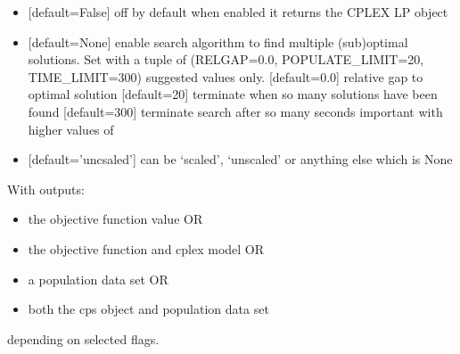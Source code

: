 \documentclass[letterpaper,10pt,english]{sphinxmanual}
\begin{document}
\begin{fulllineitems}
\begin{itemize}
\item {} 
\sphinxAtStartPar
{} {[}default=False{]} off by default when enabled it returns the CPLEX LP object

\item {} 
\sphinxAtStartPar
{} {[}default=None{]} enable search algorithm to find multiple (sub)optimal solutions. Set with a tuple of (RELGAP=0.0, POPULATE\_LIMIT=20, TIME\_LIMIT=300) suggested values only.
\sphinxhyphen{}  {[}default=0.0{]} relative gap to optimal solution
\sphinxhyphen{}  {[}default=20{]} terminate when so many solutions have been found
\sphinxhyphen{}  {[}default=300{]} terminate search after so many seconds important with higher values of 

\item {} 
\sphinxAtStartPar
{} {[}default=’uncsaled’{]} can be ‘scaled’, ‘unscaled’ or anything else which is None

\end{itemize}

\sphinxAtStartPar
With outputs:
\begin{itemize}
\item {} 
\sphinxAtStartPar
{} the objective function value OR

\item {} 
\sphinxAtStartPar
{} the objective function and cplex model OR

\item {} 
\sphinxAtStartPar
{} a population data set OR

\item {} 
\sphinxAtStartPar
{} both the cps object and population data set

\end{itemize}

\sphinxAtStartPar
depending on selected flags.

\end{fulllineitems}

\end{document}
